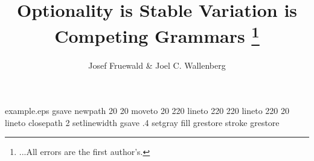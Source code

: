 %
%
%
%
%
\begin{filecontents*}{example.eps}
gsave
newpath
  20 20 moveto
  20 220 lineto
  220 220 lineto
  220 20 lineto
closepath
2 setlinewidth
gsave
  .4 setgray fill
grestore
stroke
grestore
\end{filecontents*}
%
\RequirePackage{fix-cm}
%
\documentclass{svjour3}                     %
%
\smartqed  %
%
\usepackage{mhsetup}
\usepackage{amsmath}
\usepackage{mathtools}
\usepackage{natbib}
\usepackage{graphicx}
\usepackage{float}
\usepackage{qtree}
\usepackage[utf8]{inputenc}
\usepackage{gb4e}
\noautomath
\usepackage[T1]{fontenc}
\usepackage{ tipa }
\usepackage{import}
\usepackage{color}
\usepackage{calc}
\usepackage{float}
\usepackage{subcaption}
\captionsetup{compatibility=false}
\newcommand{\noteme}[1]{\noindent \textbf{[[JCW:  #1 ]]}}
\renewcommand{\theequation}{\Alph{equation}}





\title{Optionality is Stable Variation is Competing Grammars
\thanks{...All errors are the first author's.}}


\author{Josef Fruewald \& Joel C. Wallenberg}

